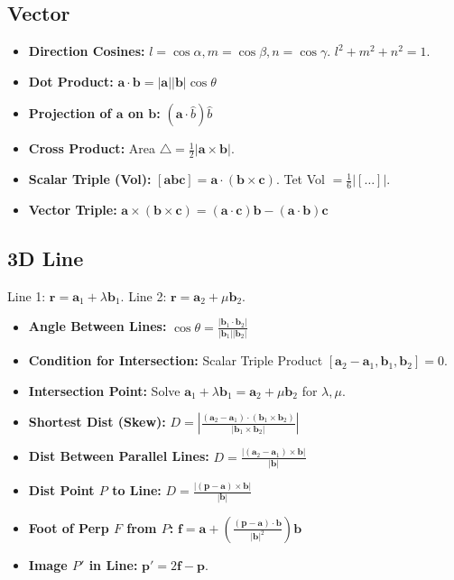 \subsection{Vector}
\begin{itemize}[leftmargin=*]
    \item \textbf{Direction Cosines:} $l=\cos\alpha, m=\cos\beta, n=\cos\gamma$. $l^2+m^2+n^2=1$.
    \item \textbf{Dot Product:} $\mathbf{a} \cdot \mathbf{b} = |\mathbf{a}||\mathbf{b}|\cos\theta$
    \item \textbf{Projection of $\mathbf{a}$ on $\mathbf{b}$:} $(\mathbf{a} \cdot \hat{b})\hat{b}$
    \item \textbf{Cross Product:} Area $\triangle = \frac{1}{2}|\mathbf{a} \times \mathbf{b}|$.
    \item \textbf{Scalar Triple (Vol):} $[\mathbf{a}\mathbf{b}\mathbf{c}] = \mathbf{a} \cdot (\mathbf{b} \times \mathbf{c})$. Tet Vol $= \frac{1}{6}|[\dots]|$.
    \item \textbf{Vector Triple:} $\mathbf{a} \times (\mathbf{b} \times \mathbf{c}) = (\mathbf{a}\cdot\mathbf{c})\mathbf{b} - (\mathbf{a}\cdot\mathbf{b})\mathbf{c}$
\end{itemize}
\subsection{3D Line}
Line 1: $\mathbf{r} = \mathbf{a}_1 + \lambda\mathbf{b}_1$. Line 2: $\mathbf{r} = \mathbf{a}_2 + \mu\mathbf{b}_2$.
\begin{itemize}[leftmargin=*]
    \item \textbf{Angle Between Lines:} $\cos \theta = \frac{|\mathbf{b}_1 \cdot \mathbf{b}_2|}{|\mathbf{b}_1||\mathbf{b}_2|}$
    \item \textbf{Condition for Intersection:} Scalar Triple Product $[\mathbf{a}_2-\mathbf{a}_1, \mathbf{b}_1, \mathbf{b}_2] = 0$.
    \item \textbf{Intersection Point:} Solve $\mathbf{a}_1 + \lambda\mathbf{b}_1 = \mathbf{a}_2 + \mu\mathbf{b}_2$ for $\lambda, \mu$.
    \item \textbf{Shortest Dist (Skew):} $D = \left| \frac{(\mathbf{a}_2 - \mathbf{a}_1) \cdot (\mathbf{b}_1 \times \mathbf{b}_2)}{|\mathbf{b}_1 \times \mathbf{b}_2|} \right|$
    \item \textbf{Dist Between Parallel Lines:} $D = \frac{|(\mathbf{a}_2 - \mathbf{a}_1) \times \mathbf{b}|}{|\mathbf{b}|}$
    \item \textbf{Dist Point $P$ to Line:} $D = \frac{|(\mathbf{p} - \mathbf{a}) \times \mathbf{b}|}{|\mathbf{b}|}$
    \item \textbf{Foot of Perp $F$ from $P$:} $\mathbf{f} = \mathbf{a} + \left( \frac{(\mathbf{p}-\mathbf{a})\cdot \mathbf{b}}{|\mathbf{b}|^2} \right)\mathbf{b}$
    \item \textbf{Image $P'$ in Line:} $\mathbf{p'} = 2\mathbf{f} - \mathbf{p}$.
\end{itemize}
